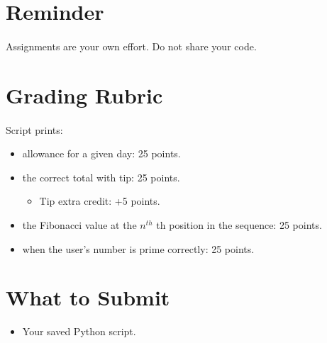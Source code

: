 \documentclass[letter,10pt]{article}
\begin{document}
    \section*{Reminder}
    \paragraph{}Assignments are your own effort. Do not share your code.
    
    \section*{Grading Rubric}
    \paragraph{}Script prints:
    \begin{itemize}
        \item allowance for a given day: 25 points.
        \item the correct total with tip: 25 points.
        \begin{itemize}
            \item Tip extra credit: +5 points.
        \end{itemize}
        \item the Fibonacci value at the $n^{th}$ th position in the sequence: 25 points.
        \item when the user's number is prime correctly: 25 points.
    \end{itemize}
    
    \section*{What to Submit}
    \begin{itemize}
        \item Your saved Python script.
    \end{itemize}
    
\end{document}

